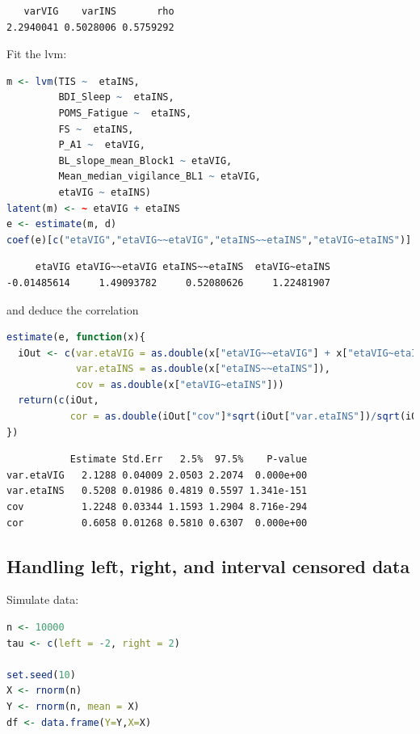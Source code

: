 \documentclass{article}
\begin{document}
\label{}
\begin{verbatim}
   varVIG    varINS       rho 
2.2940041 0.5028006 0.5759292
\end{verbatim}


Fit the lvm:
\begin{lstlisting}[language=r,numbers=none]
m <- lvm(TIS ~  etaINS,
         BDI_Sleep ~  etaINS,
         POMS_Fatigue ~  etaINS,
         FS ~  etaINS,
         P_A1 ~  etaVIG,
         BL_slope_mean_Block1 ~ etaVIG,
         Mean_median_vigilance_BL1 ~ etaVIG,
         etaVIG ~ etaINS)
latent(m) <- ~ etaVIG + etaINS
e <- estimate(m, d)
coef(e)[c("etaVIG","etaVIG~~etaVIG","etaINS~~etaINS","etaVIG~etaINS")]
\end{lstlisting}

\label{}
\begin{verbatim}
     etaVIG etaVIG~~etaVIG etaINS~~etaINS  etaVIG~etaINS 
-0.01485614     1.49093782     0.52080626     1.22481907
\end{verbatim}


and deduce the correlation
\begin{lstlisting}[language=r,numbers=none]
estimate(e, function(x){
  iOut <- c(var.etaVIG = as.double(x["etaVIG~~etaVIG"] + x["etaVIG~etaINS"]*x["etaINS~~etaINS"]),
            var.etaINS = as.double(x["etaINS~~etaINS"]),
            cov = as.double(x["etaVIG~etaINS"]))
  return(c(iOut,
           cor = as.double(iOut["cov"]*sqrt(iOut["var.etaINS"])/sqrt(iOut["var.etaVIG"]))))
})
\end{lstlisting}

\label{}
\begin{verbatim}
           Estimate Std.Err   2.5%  97.5%    P-value
var.etaVIG   2.1288 0.04009 2.0503 2.2074  0.000e+00
var.etaINS   0.5208 0.01986 0.4819 0.5597 1.341e-151
cov          1.2248 0.03344 1.1593 1.2904 8.716e-294
cor          0.6058 0.01268 0.5810 0.6307  0.000e+00
\end{verbatim}
\subsection{Handling left, right, and interval censored data}
\label{sec:org93d5daa}

Simulate data:
\begin{lstlisting}[language=r,numbers=none]
n <- 10000
tau <- c(left = -2, right = 2)

set.seed(10)
X <- rnorm(n)
Y <- rnorm(n, mean = X)
df <- data.frame(Y=Y,X=X)
\end{lstlisting}
\end{document}
